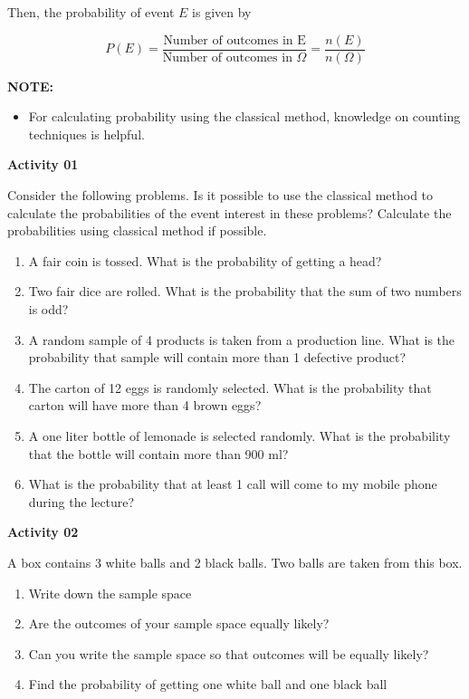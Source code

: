 \documentclass[]{book}
\providecommand{\tightlist}{%
  \setlength{\itemsep}{0pt}\setlength{\parskip}{0pt}}
\begin{document}
Then, the probability of event \(E\) is given by

\[ P(E) = \frac{\text{Number of outcomes in E}}{\text{Number of outcomes in } \Omega} = \frac{n(E)}{n(\Omega)}\]

\textbf{NOTE:}

\begin{itemize}
\tightlist
\item
  For calculating probability using the classical method, knowledge on counting techniques is helpful.
\end{itemize}

\textbf{Activity 01}

Consider the following problems. Is it possible to use the classical method to calculate the probabilities of the event interest in these problems? Calculate the probabilities using classical method if possible.

\begin{enumerate}
\def\labelenumi{(\alph{enumi})}
\item
  A fair coin is tossed. What is the probability of getting a head?
\item
  Two fair dice are rolled. What is the probability that the sum of two numbers is odd?
\item
  A random sample of 4 products is taken from a production line. What is the probability that sample will contain more than 1 defective product?
\item
  The carton of 12 eggs is randomly selected. What is the probability that carton will have more than 4 brown eggs?
\item
  A one liter bottle of lemonade is selected randomly. What is the probability that the bottle will contain more than 900 ml?
\item
  What is the probability that at least 1 call will come to my mobile phone during the lecture?
\end{enumerate}

\textbf{Activity 02}

A box contains 3 white balls and 2 black balls. Two balls are taken from this box.

\begin{enumerate}
\def\labelenumi{(\alph{enumi})}
\item
  Write down the sample space
\item
  Are the outcomes of your sample space equally likely?
\item
  Can you write the sample space so that outcomes will be equally likely?
\item
  Find the probability of getting one white ball and one black ball
\end{enumerate}
\end{document}
